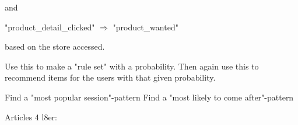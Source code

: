 and

"product\_detail\_clicked" $\Rightarrow$ "product\_wanted"

based on the store accessed.

Use this to make a "rule set" with a probability.
Then again use this to recommend items for the users with that given probability.

Find a "most popular session"-pattern
Find a "most likely to come after"-pattern


Articles 4 l8er:












